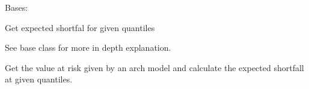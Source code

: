 \documentclass[letterpaper,10pt,english]{sphinxmanual}
\begin{document}
\begin{fulllineitems}
\label{\detokenize{dalio.pipe:dalio.pipe.builders.ExpectedShortfall}}
Bases: {\hyperref[\detokenize{dalio.pipe:dalio.pipe.builders.ValueAtRisk}]{}}

Get expected shortfal for given quantiles

See base class for more in depth explanation.

\begin{fulllineitems}
\label{\detokenize{dalio.pipe:dalio.pipe.builders.ExpectedShortfall.transform}}
Get the value at risk given by an arch model and calculate the
expected shortfall at given quantiles.

\end{fulllineitems}


\end{fulllineitems}

\end{document}
